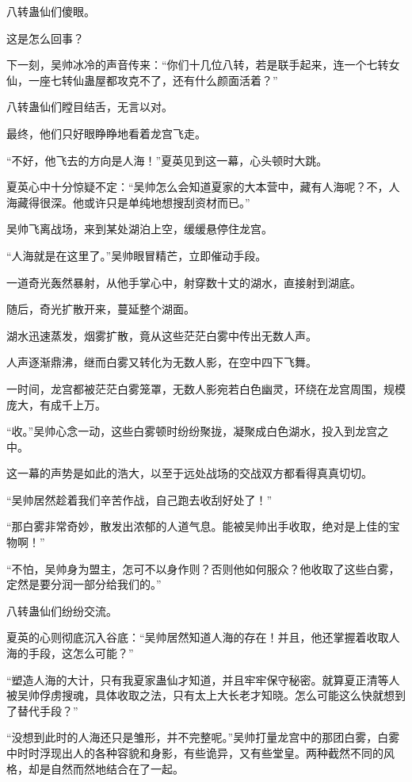 \begin{this_body}
八转蛊仙们傻眼。

这是怎么回事？

下一刻，吴帅冰冷的声音传来：“你们十几位八转，若是联手起来，连一个七转女仙，一座七转仙蛊屋都攻克不了，还有什么颜面活着？”

八转蛊仙们瞠目结舌，无言以对。

最终，他们只好眼睁睁地看着龙宫飞走。

“不好，他飞去的方向是人海！”夏英见到这一幕，心头顿时大跳。

夏英心中十分惊疑不定：“吴帅怎么会知道夏家的大本营中，藏有人海呢？不，人海藏得很深。他或许只是单纯地想搜刮资材而已。”

吴帅飞离战场，来到某处湖泊上空，缓缓悬停住龙宫。

“人海就是在这里了。”吴帅眼冒精芒，立即催动手段。

一道奇光轰然暴射，从他手掌心中，射穿数十丈的湖水，直接射到湖底。

随后，奇光扩散开来，蔓延整个湖面。

湖水迅速蒸发，烟雾扩散，竟从这些茫茫白雾中传出无数人声。

人声逐渐鼎沸，继而白雾又转化为无数人影，在空中四下飞舞。

一时间，龙宫都被茫茫白雾笼罩，无数人影宛若白色幽灵，环绕在龙宫周围，规模庞大，有成千上万。

“收。”吴帅心念一动，这些白雾顿时纷纷聚拢，凝聚成白色湖水，投入到龙宫之中。

这一幕的声势是如此的浩大，以至于远处战场的交战双方都看得真真切切。

“吴帅居然趁着我们辛苦作战，自己跑去收刮好处了！”

“那白雾非常奇妙，散发出浓郁的人道气息。能被吴帅出手收取，绝对是上佳的宝物啊！”

“不怕，吴帅身为盟主，怎可不以身作则？否则他如何服众？他收取了这些白雾，定然是要分润一部分给我们的。”

八转蛊仙们纷纷交流。

夏英的心则彻底沉入谷底：“吴帅居然知道人海的存在！并且，他还掌握着收取人海的手段，这怎么可能？”

“塑造人海的大计，只有我夏家蛊仙才知道，并且牢牢保守秘密。就算夏正清等人被吴帅俘虏搜魂，具体收取之法，只有太上大长老才知晓。怎么可能这么快就想到了替代手段？”

“没想到此时的人海还只是雏形，并不完整呢。”吴帅打量龙宫中的那团白雾，白雾中时时浮现出人的各种容貌和身影，有些诡异，又有些堂皇。两种截然不同的风格，却是自然而然地结合在了一起。


\end{this_body}

